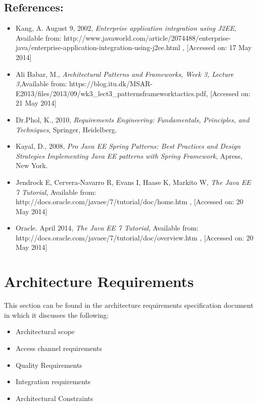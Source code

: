 \documentclass[12pt]{article}
\begin{document}
\vspace{0.2in}

\subsection{References:}
\vspace{0.1in}
\begin{itemize}
\item Kang, A. August 9, 2002, \textit{Enterprise application integration using J2EE}, Available from: http://www.javaworld.com/article/2074488/enterprise-java/enterprise-application-integration-using-j2ee.html , [Accessed on: 17 May 2014]
\item Ali Babar, M., \textit{Architectural Patterns and Frameworks, Week 3, Lecture 3},Available from: https://blog.itu.dk/MSAR-E2013/files/2013/09/wk3\_lect3\_patternsframeworktactics.pdf, [Accessed on: 21 May 2014]
\item Dr.Phol, K., 2010, \textit{Requirements Engineering: Fundamentals, Principles, and Techniques}, Springer, Heidelberg.
\item Kayal, D., 2008, \textit{Pro Java EE Spring Patterns: Best Practices and Design Strategies Implementing Java EE patterns with Spring Framework}, Apress, New York.
\item Jendrock E, Cervera-Navarro R, Evans I, Haase K, Markito W, \textit{The Java EE 7 Tutorial}, Available from: http://docs.oracle.com/javaee/7/tutorial/doc/home.htm , [Accessed on: 20 May 2014]
\item Oracle. April 2014, \textit{The Java EE 7 Tutorial}, Available from: http://docs.oracle.com/javaee/7/tutorial/doc/overview.htm , [Accessed on: 20 May 2014]
\end{itemize}	

\vspace{0.5in}

\newpage

\section{Architecture Requirements} 
This section can be found in the architecture requirements specification document in which it discusses the following:
\begin{itemize}
\item Architectural scope
\item Access channel requirements
\item Quality Requirements
\item Integration requirements
\item Architectural Constraints
\end{itemize}
\end{document}
